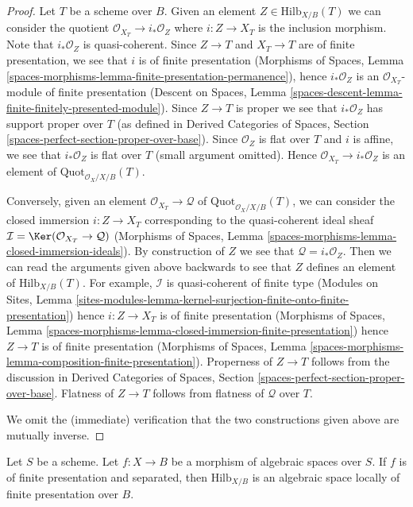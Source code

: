 \begin{proof}
Let $T$ be a scheme over $B$. Given an element
$Z \in \text{Hilb}_{X/B}(T)$ we can consider the
quotient $\mathcal{O}_{X_T} \to i_*\mathcal{O}_Z$
where $i : Z \to X_T$ is the inclusion morphism.
Note that $i_*\mathcal{O}_Z$ is quasi-coherent.
Since $Z \to T$ and $X_T \to T$ are of finite presentation,
we see that $i$ is of finite presentation (Morphisms of Spaces, Lemma
\ref{spaces-morphisms-lemma-finite-presentation-permanence}), hence
$i_*\mathcal{O}_Z$ is an $\mathcal{O}_{X_T}$-module of
finite presentation (Descent on Spaces, Lemma
\ref{spaces-descent-lemma-finite-finitely-presented-module}).
Since $Z \to T$ is proper we see that $i_*\mathcal{O}_Z$
has support proper over $T$ (as defined in
Derived Categories of Spaces, Section
\ref{spaces-perfect-section-proper-over-base}).
Since $\mathcal{O}_Z$ is flat
over $T$ and $i$ is affine, we see that $i_*\mathcal{O}_Z$
is flat over $T$ (small argument omitted). Hence
$\mathcal{O}_{X_T} \to i_*\mathcal{O}_Z$
is an element of $\text{Quot}_{\mathcal{O}_X/X/B}(T)$.

\medskip\noindent
Conversely, given an element $\mathcal{O}_{X_T} \to \mathcal{Q}$
of $\text{Quot}_{\mathcal{O}_X/X/B}(T)$, we can consider
the closed immersion $i : Z \to X_T$ corresponding to
the quasi-coherent ideal sheaf
$\mathcal{I} = \Ker(\mathcal{O}_{X_T} \to \mathcal{Q})$
(Morphisms of Spaces, Lemma
\ref{spaces-morphisms-lemma-closed-immersion-ideals}).
By construction of $Z$ we see that $\mathcal{Q} = i_*\mathcal{O}_Z$.
Then we can read the arguments given above backwards to see
that $Z$ defines an element of $\text{Hilb}_{X/B}(T)$.
For example, $\mathcal{I}$ is quasi-coherent of finite type
(Modules on Sites, Lemma
\ref{sites-modules-lemma-kernel-surjection-finite-onto-finite-presentation})
hence $i : Z \to X_T$ is of finite presentation
(Morphisms of Spaces, Lemma
\ref{spaces-morphisms-lemma-closed-immersion-finite-presentation})
hence $Z \to T$ is of finite presentation
(Morphisms of Spaces, Lemma
\ref{spaces-morphisms-lemma-composition-finite-presentation}).
Properness of $Z \to T$ follows from the discussion in
Derived Categories of Spaces, Section
\ref{spaces-perfect-section-proper-over-base}.
Flatness of $Z \to T$ follows from flatness of $\mathcal{Q}$ over $T$.

\medskip\noindent
We omit the (immediate) verification that the two constructions given
above are mutually inverse.
\end{proof}

\begin{proposition}
\label{proposition-hilb}
Let $S$ be a scheme. Let $f : X \to B$ be a morphism of algebraic
spaces over $S$. If $f$ is of finite presentation and separated, then
$\text{Hilb}_{X/B}$ is an algebraic space locally of finite
presentation over $B$.
\end{proposition}

